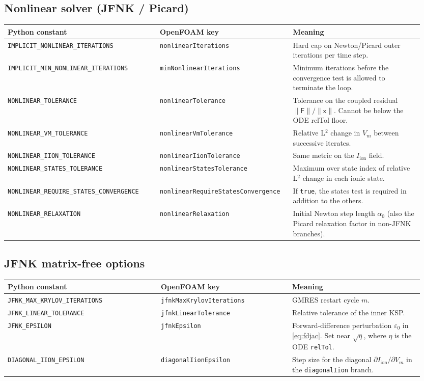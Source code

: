 \documentclass[11pt,a4paper]{article}
\newcommand{\Vm}{V_{m}}
\newcommand{\Iion}{I_{\text{ion}}}
\newcommand{\code}[1]{\texttt{\small #1}}
\begin{document}
\subsection{Nonlinear solver (JFNK / Picard)}
\begin{longtable}{@{}p{0.35\linewidth}p{0.30\linewidth}p{0.30\linewidth}@{}}
\toprule
Python constant & OpenFOAM key & Meaning \\
\midrule \endhead
\code{IMPLICIT\_NONLINEAR\_ITERATIONS} &
   \code{nonlinearIterations} &
   Hard cap on Newton/Picard outer iterations per time step. \\
\code{IMPLICIT\_MIN\_NONLINEAR\_ITERATIONS} &
   \code{minNonlinearIterations} &
   Minimum iterations before the convergence test is allowed
   to terminate the loop. \\
\code{NONLINEAR\_TOLERANCE} & \code{nonlinearTolerance} &
   Tolerance on the coupled residual
   $\lVert \mathsf{F} \rVert / \lVert \mathsf{x} \rVert$.
   Cannot be below the ODE relTol floor. \\
\code{NONLINEAR\_VM\_TOLERANCE} & \code{nonlinearVmTolerance} &
   Relative L$^{2}$ change in $\Vm$ between successive iterates. \\
\code{NONLINEAR\_IION\_TOLERANCE} & \code{nonlinearIionTolerance} &
   Same metric on the $\Iion$ field. \\
\code{NONLINEAR\_STATES\_TOLERANCE} &
   \code{nonlinearStatesTolerance} &
   Maximum over state index of relative L$^{2}$ change in
   each ionic state. \\
\code{NONLINEAR\_REQUIRE\_STATES\_CONVERGENCE} &
   \code{nonlinearRequireStatesConvergence} &
   If \code{true}, the states test is required in addition
   to the others. \\
\code{NONLINEAR\_RELAXATION} & \code{nonlinearRelaxation} &
   Initial Newton step length $\alpha_{0}$ (also the
   Picard relaxation factor in non-JFNK branches). \\
\bottomrule
\end{longtable}

\subsection{JFNK matrix-free options}
\begin{longtable}{@{}p{0.35\linewidth}p{0.30\linewidth}p{0.30\linewidth}@{}}
\toprule
Python constant & OpenFOAM key & Meaning \\
\midrule \endhead
\code{JFNK\_MAX\_KRYLOV\_ITERATIONS} &
   \code{jfnkMaxKrylovIterations} &
   GMRES restart cycle $m$. \\
\code{JFNK\_LINEAR\_TOLERANCE} & \code{jfnkLinearTolerance} &
   Relative tolerance of the inner KSP. \\
\code{JFNK\_EPSILON} & \code{jfnkEpsilon} &
   Forward-difference perturbation $\varepsilon_{0}$ in
   \eqref{eq:fdjac}. Set near $\sqrt{\eta}$, where $\eta$ is the
   ODE \code{relTol}. \\
\code{DIAGONAL\_IION\_EPSILON} & \code{diagonalIionEpsilon} &
   Step size for the diagonal $\partial \Iion / \partial \Vm$
   in the \code{diagonalIion} branch. \\
\bottomrule
\end{longtable}
\end{document}
